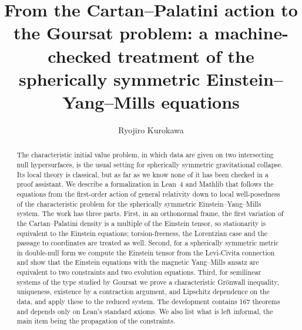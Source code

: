 \documentclass{lmcs}
\begin{document}
\title[Cartan--Palatini to Goursat, machine-checked]{From the Cartan--Palatini action to the Goursat problem: a machine-checked treatment of the spherically symmetric Einstein--Yang--Mills equations}

\author[R.~Kurokawa]{Ryojiro Kurokawa}
\address{Graduate School of Science and Technology, Tokyo University of Science, Noda, Chiba, Japan}

\begin{abstract}
\noindent The characteristic initial value problem, in which data are given on two intersecting null hypersurfaces, is the usual setting for spherically symmetric gravitational collapse. Its local theory is classical, but as far as we know none of it has been checked in a proof assistant. We describe a formalization in Lean~4 and Mathlib that follows the equations from the first-order action of general relativity down to local well-posedness of the characteristic problem for the spherically symmetric Einstein--Yang--Mills system. The work has three parts. First, in an orthonormal frame, the first variation of the Cartan--Palatini density is a multiple of the Einstein tensor, so stationarity is equivalent to the Einstein equations; torsion-freeness, the Lorentzian case and the passage to coordinates are treated as well. Second, for a spherically symmetric metric in double-null form we compute the Einstein tensor from the Levi-Civita connection and show that the Einstein equations with the magnetic Yang--Mills ansatz are equivalent to two constraints and two evolution equations. Third, for semilinear systems of the type studied by Goursat we prove a characteristic Gr\"onwall inequality, uniqueness, existence by a contraction argument, and Lipschitz dependence on the data, and apply these to the reduced system. The development contains 167 theorems and depends only on Lean's standard axioms. We also list what is left informal, the main item being the propagation of the constraints.
\end{abstract}


\maketitle
\end{document}
